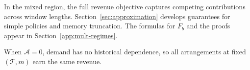 \begingroup\color{black}
In the mixed region, the full revenue objective captures competing contributions across window lengths. Section~\ref{sec:approximation} develops guarantees for simple policies and memory truncation. The formulas for \(F_b\) and the proofs appear in Section~\ref{app:mult-regimes}.
\par\endgroup When \(\mathcal A=0\), demand has no historical dependence, so all arrangements at fixed \((\mathcal T,m)\) earn the same revenue.

\FloatBarrier
\par\endgroup
